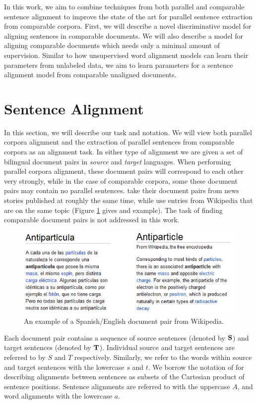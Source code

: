 \documentclass[11pt,letterpaper]{article}
\begin{document}
In this work, we aim to combine techniques from both parallel and comparable
sentence alignment to improve the state of the art for parallel sentence
extraction from comparable corpora. First, we will describe a novel
discriminative model for aligning sentences in comparable documents.
We will also describe a model for aligning comparable documents which
needs only a minimal amount of supervision. Similar to how unsupervised word
alignment models can learn their parameters from unlabeled data, we aim to learn
parameters for a sentence alignment model from comparable unaligned documents.

\section{Sentence Alignment}
In this section, we will describe our task and notation.
We will view both parallel corpora alignment and the extraction of parallel
sentences from comparable corpora as an alignment task. In either type of
alignment we are given a set of bilingual document pairs in {\em source} and {\em
target} languages. When performing parallel corpora alignment, these document
pairs will correspond to each other very strongly, while in the case of
comparable corpora, some these document pairs may contain no parallel sentences.
 take their document pairs from news stories published at
roughly the same time, while  use entries from
Wikipedia that are on the same topic (Figure \ref{fig:wiki} gives and example).
The task of finding comparable document pairs is not addressed in this work.

\begin{figure}[ht]
\includegraphics[width=\textwidth]{images/wiki.jpg}
\caption{An example of a Spanish/English document pair from Wikipedia.}
\label{fig:wiki}
\end{figure}

Each document pair contains a sequence of source sentences (denoted by ${\bf
S}$) and target sentences (denoted by ${\bf T}$). Individual source and target
sentences are referred to by $S$ and $T$ respectively. Similarly, we refer to
the words within source and target sentences with the lowercase $s$ and $t$. We
borrow the notation of \cite{Och03} for describing alignments between sentences
as subsets of the Cartesian product of sentence positions. Sentence alignments
are referred to with the uppercase $A$, and word alignments with the lowercase
$a$.
\end{document}
